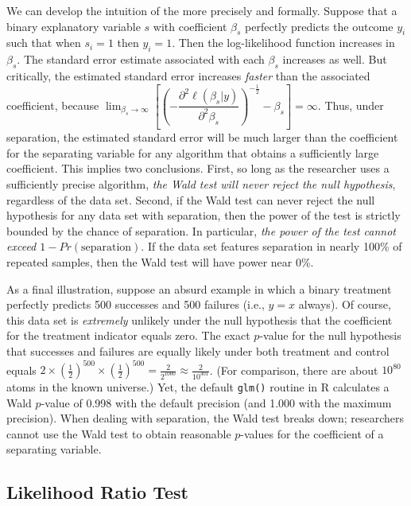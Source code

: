 \documentclass[
]{article}
\begin{document}
We can develop the intuition of the more precisely and formally. Suppose
that a binary explanatory variable \(s\) with coefficient \(\beta_s\)
perfectly predicts the outcome \(y_i\) such that when \(s_i = 1\) then
\(y_i = 1\). Then the log-likelihood function increases in \(\beta_s\).
The standard error estimate associated with each \(\beta_s\) increases
as well. But critically, the estimated standard error increases
\emph{faster} than the associated coefficient, because
\(\lim_{\beta_s \to \infty} \left[ \left( - \dfrac{\partial^2 \ell(\beta_s | y)}{\partial^2 \beta_s} \right)^{-\frac{1}{2}} - \beta_s \right] = \infty\).
Thus, under separation, the estimated standard error will be much larger
than the coefficient for the separating variable for any algorithm that
obtains a sufficiently large coefficient. This implies two conclusions.
First, so long as the researcher uses a sufficiently precise algorithm,
\emph{the Wald test will never reject the null hypothesis}, regardless
of the data set. Second, if the Wald test can never reject the null
hypothesis for any data set with separation, then the power of the test
is strictly bounded by the chance of separation. In particular,
\emph{the power of the test cannot exceed
\(1 - Pr(\text{separation})\)}. If the data set features separation in
nearly 100\% of repeated samples, then the Wald test will have power
near 0\%.

As a final illustration, suppose an absurd example in which a binary
treatment perfectly predicts 500 successes and 500 failures (i.e.,
\(y = x\) always). Of course, this data set is \emph{extremely} unlikely
under the null hypothesis that the coefficient for the treatment
indicator equals zero. The exact \(p\)-value for the null hypothesis
that successes and failures are equally likely under both treatment and
control equals
\(2 \times \left( \frac{1}{2} \right)^{500} \times \left( \frac{1}{2} \right)^{500} = \frac{2}{2^{1000}} \approx \frac{2}{10^{301}}\).
(For comparison, there are about \(10^{80}\) atoms in the known
universe.) Yet, the default \texttt{glm()} routine in R calculates a
Wald \(p\)-value of 0.998 with the default precision (and 1.000 with the
maximum precision). When dealing with separation, the Wald test breaks
down; researchers cannot use the Wald test to obtain reasonable
\(p\)-values for the coefficient of a separating variable.

\hypertarget{likelihood-ratio-test}{%
\subsection{Likelihood Ratio Test}\label{likelihood-ratio-test}}
\end{document}
